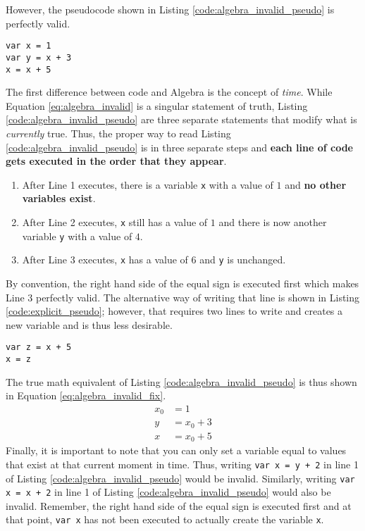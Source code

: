 \documentclass{article}
\begin{document}
However, the pseudocode shown in Listing \ref{code:algebra_invalid_pseudo} is perfectly valid.
\begin{lstlisting}[caption={The equivalent of Equation \ref{eq:algebra_invalid} in our pseudo-language.}, label={code:algebra_invalid_pseudo}]
var x = 1
var y = x + 3
x = x + 5
\end{lstlisting}
The first difference between code and Algebra is the concept of \textit{time}.
While Equation \ref{eq:algebra_invalid} is a singular statement of truth, Listing \ref{code:algebra_invalid_pseudo} are three separate statements that modify what is \textit{currently} true.
Thus, the proper way to read Listing \ref{code:algebra_invalid_pseudo} is in three separate steps and \textbf{each line of code gets executed in the order that they appear}.
\begin{enumerate}
\item After Line 1 executes, there is a variable \lstinline{x} with a value of $1$ and \textbf{no other variables exist}.
\item After Line 2 executes, \lstinline{x} still has a value of $1$ and there is now another variable \lstinline{y} with a value of $4$.
\item After Line 3 executes, \lstinline{x} has a value of $6$ and \lstinline{y} is unchanged.
\end{enumerate}
By convention, the right hand side of the equal sign is executed first which makes Line 3 perfectly valid.
The alternative way of writing that line is shown in Listing \ref{code:explicit_pseudo}; however, that requires two lines to write and creates a new variable and is thus less desirable.
\begin{lstlisting}[caption={A more explicit $x = x + 5$.}, label={code:explicit_pseudo}]
var z = x + 5
x = z
\end{lstlisting}
The true math equivalent of Listing \ref{code:algebra_invalid_pseudo} is thus shown in Equation \ref{eq:algebra_invalid_fix}.
\begin{equation}
\begin{aligned}
x_0 & = 1 \\
y & = x_0 + 3 \\
x & = x_0 + 5
\end{aligned}
\label{eq:algebra_invalid_fix}
\end{equation}
Finally, it is important to note that you can only set a variable equal to values that exist at that current moment in time.
Thus, writing \lstinline{var x = y + 2} in line 1 of Listing \ref{code:algebra_invalid_pseudo} would be invalid.
Similarly, writing \lstinline{var x = x + 2} in line 1 of Listing \ref{code:algebra_invalid_pseudo} would also be invalid.
Remember, the right hand side of the equal sign is executed first and at that point, \lstinline{var x} has not been executed to actually create the variable \lstinline{x}.
\end{document}
